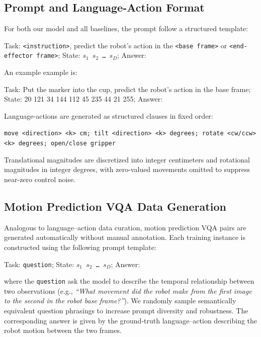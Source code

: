 \subsection{Prompt and Language-Action Format}
For both our model and all baselines, the prompt follow a structured template:

\begin{tcolorbox}[promptbox]
Task: \texttt{<instruction>}, predict the robot's action in the \texttt{<base frame>} or \texttt{<end-effector frame>}; State: \texttt{$s_1$\ $s_2$\ \ldots\ $s_D$}; Answer:
\end{tcolorbox}

An example example is:

\begin{tcolorbox}[promptbox]
Task: Put the marker into the cup, predict the robot's action in the base frame; State: 20 121 34 144 112 45 235 44 21 255; Answer:
\end{tcolorbox}

Language-actions are generated as structured clauses in fixed order:

\begin{tcolorbox}[promptbox]
\texttt{move <direction> <k> cm; tilt <direction> <k> degrees; rotate <cw/ccw> <k> degrees; open/close gripper}
\end{tcolorbox}

Translational magnitudes are discretized into integer centimeters and rotational magnitudes in integer degrees, with zero-valued movements omitted to suppress near-zero control noise.

\subsection{Motion Prediction VQA Data Generation}
Analogous to language–action data curation, motion prediction VQA pairs are generated automatically without manual annotation. Each training instance is constructed using the following prompt template:
\begin{tcolorbox}[promptbox]
Task: \texttt{question}; State: \texttt{$s_1$\ $s_2$\ \ldots\ $s_D$}; Answer:
\end{tcolorbox}
\noindent where the \texttt{question} ask the model to describe the temporal relationship between two observations (e.g., \emph{“What movement did the robot make from the first image to the second in the robot base frame?”}). We randomly sample semantically equivalent question phrasings to increase prompt diversity and robustness. The corresponding answer is given by the ground-truth language–action describing the robot motion between the two frames.


